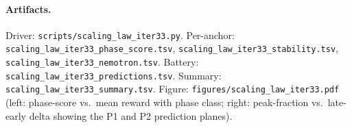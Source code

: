 \paragraph{Artifacts.}
Driver: \texttt{scripts/scaling\_law\_iter33.py}.
Per-anchor: \texttt{scaling\_law\_iter33\_phase\_score.tsv},
\texttt{scaling\_law\_iter33\_stability.tsv},
\texttt{scaling\_law\_iter33\_nemotron.tsv}.
Battery: \texttt{scaling\_law\_iter33\_predictions.tsv}.
Summary: \texttt{scaling\_law\_iter33\_summary.tsv}.
Figure: \texttt{figures/scaling\_law\_iter33.pdf} (left:
phase-score vs.\ mean reward with phase class; right: peak-fraction
vs.\ late-early delta showing the P1 and P2 prediction planes).

